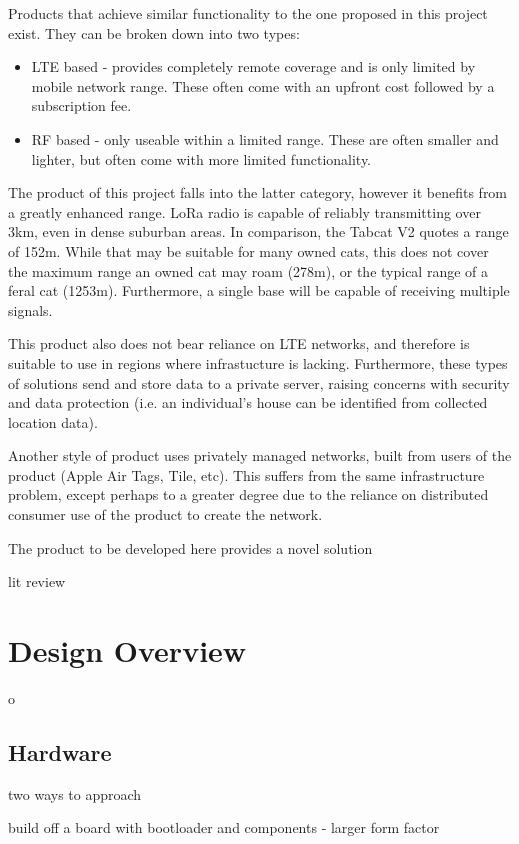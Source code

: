\documentclass[11pt]{article}
\begin{document}
Products that achieve similar functionality to the one proposed in this project exist. They can be broken down into two types: \begin{itemize}
    \item LTE based - provides completely remote coverage and is only limited by mobile network range. These often come with an upfront cost followed by a subscription fee.
    \item RF based - only useable within a limited range. These are often smaller and lighter, but often come with more limited functionality. 
\end{itemize}
The product of this project falls into the latter category, however it benefits from a greatly enhanced range.
LoRa radio is capable of reliably transmitting over 3km, even in dense suburban areas\cite{augustin:lora}.
In comparison, the Tabcat V2 quotes a range of 152m\cite{tabcat:tracker}. 
While that may be suitable for many owned cats, 
this does not cover the maximum range an owned cat may roam (278m\cite{hammer:urbanisaton}),
or the typical range of a feral cat (1253m\cite{horn:range}).
Furthermore, a single base will be capable of receiving multiple signals.

This product also does not bear reliance on LTE networks, and therefore is suitable to use in regions where infrastucture is lacking.
Furthermore, these types of solutions send and store data to a private server, raising concerns with security and data protection (i.e. an individual's house can be identified from collected location data).

Another style of product uses privately managed networks, built from users of the product (Apple Air Tags, Tile, etc).
This suffers from the same infrastructure problem, except perhaps to a greater degree due to the reliance on distributed consumer use of the product to create the network.

The product to be developed here provides a novel solution

lit review

\section{Design Overview}

o\subsection{Hardware}
two ways to approach

build off a board with bootloader and components - larger form factor
\end{document}
